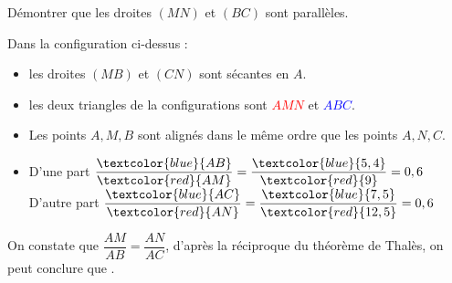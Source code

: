 \begin{methode*1}
\begin{minipage}{8cm}
                Démontrer que les droites $(MN)$ et $(BC)$ sont parallèles.
            \end{minipage}
            
            \correction
            Dans la configuration ci-dessus : 
            \begin{itemize}
                \item les droites $(MB)$ et $(CN)$ sont sécantes en $A$.                
                \item les deux triangles de la configurations sont \textcolor{red}{$AMN$} et \textcolor{blue}{$ABC$}.
                \item Les points $A, M, B$ sont alignés dans le même ordre que les points $A, N, C$.
                \medskip
                \item D'une part $\dfrac{\textcolor{blue}{AB}}{\textcolor{red}{AM}} = \dfrac{\textcolor{blue}{5,4}}{\textcolor{red}{9}}=0,6$
                \hfill
                D'autre part $\dfrac{\textcolor{blue}{AC}}{\textcolor{red}{AN}} = \dfrac{\textcolor{blue}{7,5}}{\textcolor{red}{12,5}}=0,6$
            \end{itemize}
            On constate que $\dfrac{AM}{AB} = \dfrac{AN}{AC}$, d'après la réciproque du théorème de Thalès, on peut conclure que .
        \end{methode*1}